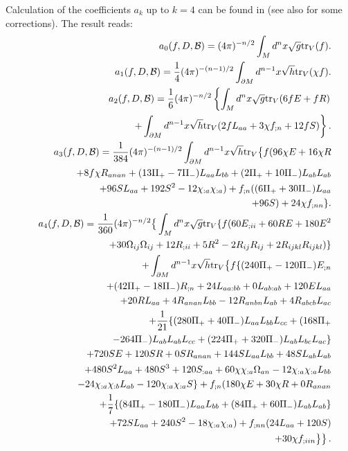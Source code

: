 Calculation of the coefficients $a_k$ up to $k=4$ can be found
in \cite{Branson:1990a} (see also \cite{Vassilevich:1995we} for
some corrections). The result reads:
\begin{eqnarray}
&&a_0(f,D,\mathcal{ B})=(4\pi)^{-n/2}\int_M d^nx\sqrt{g} {\rm tr}_V(f).\label{a0bou} \\
&&a_1(f,D,\mathcal{ B})={\frac 14}(4\pi)^{-(n-1)/2}\int_{\partial M} d^{n-1}x\sqrt{h}
     {\rm tr}_V (\chi f). \label{a1bou} \\
&&a_2(f,D,\mathcal{ B})=\frac 16 (4\pi)^{-n/2}\left\{ \int_M d^nx\sqrt{g}
     {\rm tr}_V(6fE+fR) \right. \nonumber \\
&&\qquad\qquad \left. +\int_{\partial M} d^{n-1}x\sqrt{h} {\rm tr}_V(2fL_{ aa}+3 \chi f_{ ;n}+12fS)
     \right\} .\label{a2bou} \\
&&a_3(f,D,\mathcal{ B})=\frac 1{384}(4 \pi )^{
       -(n-1)/2}  \int_{\partial M} d^{n-1}x\sqrt{h} {\rm tr}_V\big\{ f(96 \chi E+16\chi  R \nonumber\\
&&\qquad\qquad+8f \chi R_{anan} 
       +(13 \Pi_{+}-7 \Pi_{ -})L_{ aa}L_{ bb}+(2 \Pi_{ +}+10
      \Pi_{-})L_{ab}L_{ ab}\nonumber\\
&&\qquad\qquad+96SL_{ aa}
      +192S^2 
       -12 \chi_{ :a} \chi_{:a})+f_{ ;n}
      ((6 \Pi_{ +}+30 \Pi_{ -})L_{
        aa}\nonumber\\
&&\qquad\qquad+96S)+24 \chi f_{ ;nn} \}.\label{a3bou}\\
&&a_4(f,D,\mathcal{ B})=\frac 1{360} (4 \pi )^{
       -n/2} \big\{ \int_M d^nx\sqrt{g} {\rm tr}_V
       \{ f(60E_{ ; ii}+60 R E+180E^2 \nonumber \\
&&\qquad\qquad +30 \Omega_{ij} 
      \Omega_{ij} +12 R_{;ii}+
      5 R^2-2R_{ij}R_{ij}+2R_{ijkl}R_{ijkl}) \} \nonumber \\
&&\qquad\qquad+ \int_{\partial M} d^{n-1}x\sqrt{h} {\rm tr}_V
      \big\{ f \{ (240 \Pi_{ +}-120 \Pi_{ -})E_{ ;n}\nonumber\\
&&\qquad\qquad+(42 \Pi_{
     +}-18 \Pi_{ -}) R_{ ;n} 
     +24L_{ aa:bb}+0L_{ ab:ab}+120EL_{
       aa}\nonumber\\ 
&&\qquad\qquad +20 R L_{ aa}+4R_{ an    an}L_{bb} 
      -12R_{ an    bn}L_{ ab}+4R_{
       ab    cb}L_{ ac}\nonumber\\
&&\qquad\qquad +\frac 1{21} \{ (280 \Pi_{ +}+40 \Pi_{
-})L_{ aa}L_{ bb}L_{ cc} 
    +(168 \Pi_{ +}\nonumber\\
&&\qquad\qquad -264 \Pi_{
-})L_{ ab}L_{ ab}L_{ cc}+(224 \Pi_{
+}+320 \Pi_{ -})L_{ ab}L_{ bc}L_{ac} \} \nonumber \\
&&\qquad\qquad +720SE+120S R +0SR_{ an    an}+144SL_{
aa}L_{ bb}+48SL_{ ab}L_{ ab} \nonumber \\
 &&\qquad\qquad+480S^2L_{ aa}+480S^{
3}+120S_{ :aa}+60 \chi  \chi_{ :a} \Omega_{ an}-12 \chi_{ :a} \chi_{
:a}L_{ bb} \nonumber \\
&&\qquad\qquad -24 \chi_{ :a} \chi_{
:b}L_{ ab}-120 \chi_{ :a} \chi_{
:a}S \} +f_{ ;n}(180 \chi E+30 \chi  R +0R_{
an an} \nonumber \\
&&\qquad\qquad +\frac 17 \{ (84 \Pi_{
+}-180 \Pi_{ -})L_{ aa}L_{ bb}+(84 \Pi_{
+}+60 \Pi_{ -})L_{ ab}L_{ ab} \} \nonumber \\
&&\qquad\qquad +72SL_{ aa}+240S^2-18 \chi_{
:a} \chi_{ :a})+f_{ ;nn}(24L_{
aa}+120S) \nonumber \\
&&\qquad\qquad
\left. +30 \chi f_{ ;iin}  \big\} \right\} . \label{a4bou}
\end{eqnarray}
